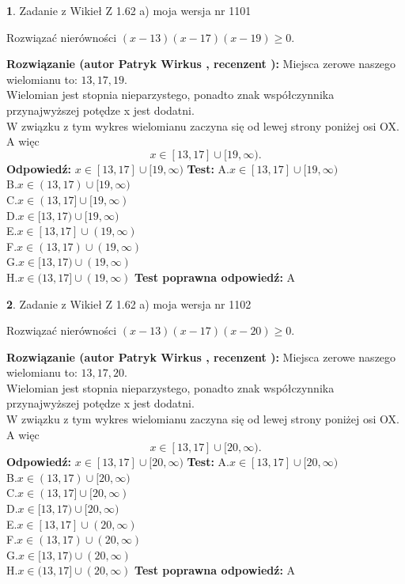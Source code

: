 \documentclass[12pt, a4paper]{article}
\theoremstyle{definition} %
\newtheorem{zad}{}
\newcommand{\zadStart}[1]{\begin{zad}#1\newline}
\newcommand{\zadStop}{\end{zad}}
\newcommand{\rozwStart}[2]{\noindent \textbf{Rozwiązanie (autor #1 , recenzent #2): }\newline}
\newcommand{\rozwStop}{\newline}
\newcommand{\odpStart}{\noindent \textbf{Odpowiedź:}\newline}
\newcommand{\odpStop}{\newline}
\newcommand{\testStart}{\noindent \textbf{Test:}\newline}
\newcommand{\testStop}{\newline}
\newcommand{\kluczStart}{\noindent \textbf{Test poprawna odpowiedź:}\newline}
\newcommand{\kluczStop}{\newline}
\begin{document}
\zadStart{Zadanie z Wikieł Z 1.62 a) moja wersja nr 1101}

Rozwiązać nierówności $(x-13)(x-17)(x-19)\ge0$.
\zadStop
\rozwStart{Patryk Wirkus}{}
Miejsca zerowe naszego wielomianu to: $13, 17, 19$.\\
Wielomian jest stopnia nieparzystego, ponadto znak współczynnika przy\linebreak najwyższej potędze x jest dodatni.\\ W związku z tym wykres wielomianu zaczyna się od lewej strony poniżej osi OX. A więc $$x \in [13,17] \cup [19,\infty).$$
\rozwStop
\odpStart
$x \in [13,17] \cup [19,\infty)$
\odpStop
\testStart
A.$x \in [13,17] \cup [19,\infty)$\\
B.$x \in (13,17) \cup [19,\infty)$\\
C.$x \in (13,17] \cup [19,\infty)$\\
D.$x \in [13,17) \cup [19,\infty)$\\
E.$x \in [13,17] \cup (19,\infty)$\\
F.$x \in (13,17) \cup (19,\infty)$\\
G.$x \in [13,17) \cup (19,\infty)$\\
H.$x \in (13,17] \cup (19,\infty)$
\testStop
\kluczStart
A
\kluczStop



\zadStart{Zadanie z Wikieł Z 1.62 a) moja wersja nr 1102}

Rozwiązać nierówności $(x-13)(x-17)(x-20)\ge0$.
\zadStop
\rozwStart{Patryk Wirkus}{}
Miejsca zerowe naszego wielomianu to: $13, 17, 20$.\\
Wielomian jest stopnia nieparzystego, ponadto znak współczynnika przy\linebreak najwyższej potędze x jest dodatni.\\ W związku z tym wykres wielomianu zaczyna się od lewej strony poniżej osi OX. A więc $$x \in [13,17] \cup [20,\infty).$$
\rozwStop
\odpStart
$x \in [13,17] \cup [20,\infty)$
\odpStop
\testStart
A.$x \in [13,17] \cup [20,\infty)$\\
B.$x \in (13,17) \cup [20,\infty)$\\
C.$x \in (13,17] \cup [20,\infty)$\\
D.$x \in [13,17) \cup [20,\infty)$\\
E.$x \in [13,17] \cup (20,\infty)$\\
F.$x \in (13,17) \cup (20,\infty)$\\
G.$x \in [13,17) \cup (20,\infty)$\\
H.$x \in (13,17] \cup (20,\infty)$
\testStop
\kluczStart
A
\kluczStop
\end{document}
